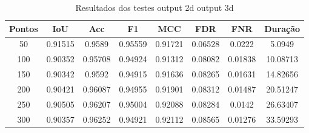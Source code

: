 \begin{table}[h]
            \centering
            \caption{Resultados dos testes output 2d output 3d}
            \label{tab:final_output_2d_output_3d}
            \begin{tabular}{|c|c|c|c|c|c|c|c|}
                \hline
                                Pontos & IoU & Acc & F1 & MCC & FDR & FNR & Duração \\
                \hline
                50 & 0.91515 & 0.9589 & 0.95559 & 0.91721 & 0.06528 & 0.0222 & 5.0949\\
        100 & 0.90352 & 0.95708 & 0.94924 & 0.91312 & 0.08082 & 0.01838 & 10.08713\\
        150 & 0.90342 & 0.9592 & 0.94915 & 0.91636 & 0.08265 & 0.01631 & 14.82656\\
        200 & 0.90421 & 0.96087 & 0.94955 & 0.91901 & 0.08312 & 0.01487 & 20.51247\\
        250 & 0.90505 & 0.96207 & 0.95004 & 0.92088 & 0.08284 & 0.0142 & 26.63407\\
        300 & 0.90357 & 0.96252 & 0.94921 & 0.92112 & 0.08565 & 0.01276 & 33.59293\\
                \hline
            \end{tabular}
        \end{table}


